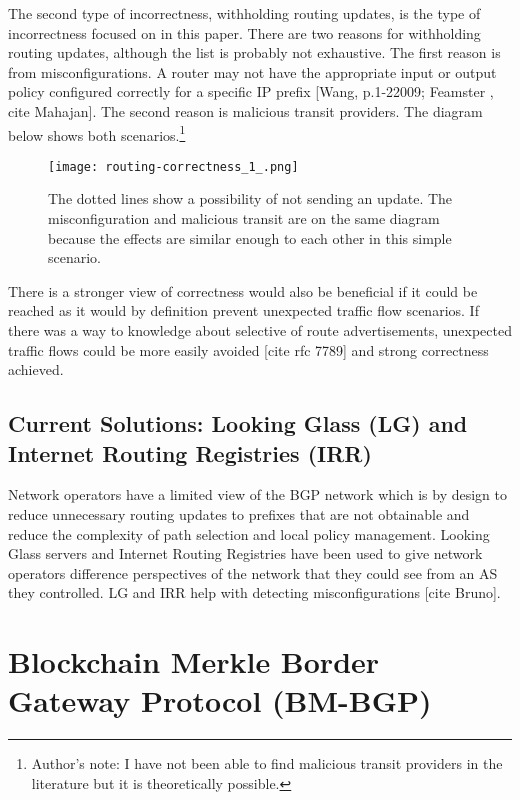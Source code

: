 \documentclass[letterpaper, 10 pt, conference]{ieeeconf}  %
\begin{document}
The second type of incorrectness, withholding routing updates, is the type of incorrectness focused on in this paper. There are two reasons for withholding routing updates, although the list is probably not exhaustive. The first reason is from misconfigurations. A router may not have the appropriate input or output policy configured correctly for a specific IP prefix [Wang, p.1-22009; Feamster , cite Mahajan]. The second reason is malicious transit providers. The diagram below shows both scenarios.\footnote{Author's note: I have not been able to find malicious transit providers in the literature but it is theoretically possible.}

\begin{figure}[!ht]
	\centering
	\texttt{[image: routing-correctness\_1\_.png]}
    \caption{The dotted lines show a possibility of not sending an update. The misconfiguration and malicious transit are on the same diagram because the effects are similar enough to each other in this simple scenario.  
}

\end{figure}

There is a stronger view of correctness would also be beneficial if it could be reached as it would by definition prevent unexpected traffic flow scenarios. If there was a way to knowledge about selective of route advertisements, unexpected traffic flows could be more easily avoided [cite rfc 7789] and strong correctness achieved. 

\subsection{Current Solutions: Looking Glass (LG) and Internet Routing Registries (IRR)}

Network operators have a limited view of the BGP network which is by design to reduce unnecessary routing updates to prefixes that are not obtainable and reduce the complexity of path selection and local policy management. Looking Glass servers and Internet Routing Registries have been used to give network operators difference perspectives of the network that they could see from an AS they controlled. LG and IRR help with detecting misconfigurations [cite Bruno].

\section{Blockchain Merkle Border Gateway Protocol (BM-BGP)}
\end{document}
